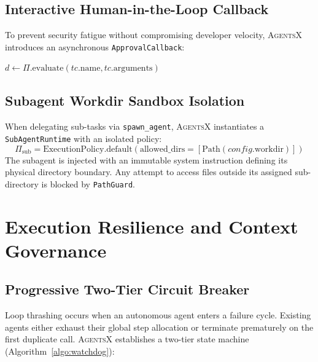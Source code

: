\documentclass[10pt,twocolumn,letterpaper]{article}
\begin{document}
\subsection{Interactive Human-in-the-Loop Callback}
To prevent security fatigue without compromising developer velocity, \textsc{AgentsX} introduces an asynchronous \texttt{ApprovalCallback}:
\begin{algorithm}[H]
\small
\SetAlgoLollipop
{}
$d \leftarrow \Pi.\text{evaluate}(tc.\text{name}, tc.\text{arguments})$\;
\caption{Security Policy Evaluation with Interactive Approval Callback.}
\label{algo:policy}
\end{algorithm}

\subsection{Subagent Workdir Sandbox Isolation}
When delegating sub-tasks via \texttt{spawn\_agent}, \textsc{AgentsX} instantiates a \texttt{SubAgentRuntime} with an isolated policy:
\begin{equation}
\Pi_{\text{sub}} = \text{ExecutionPolicy}.\text{default}(\text{allowed\_dirs}=[\text{Path}(config.\text{workdir})])
\end{equation}
The subagent is injected with an immutable system instruction defining its physical directory boundary. Any attempt to access files outside its assigned sub-directory is blocked by \texttt{PathGuard}.

\section{Execution Resilience and Context Governance}
\label{sec:resilience}

\subsection{Progressive Two-Tier Circuit Breaker}
Loop thrashing occurs when an autonomous agent enters a failure cycle. Existing agents either exhaust their global step allocation or terminate prematurely on the first duplicate call. \textsc{AgentsX} establishes a two-tier state machine (Algorithm~\ref{algo:watchdog}):
\end{document}
